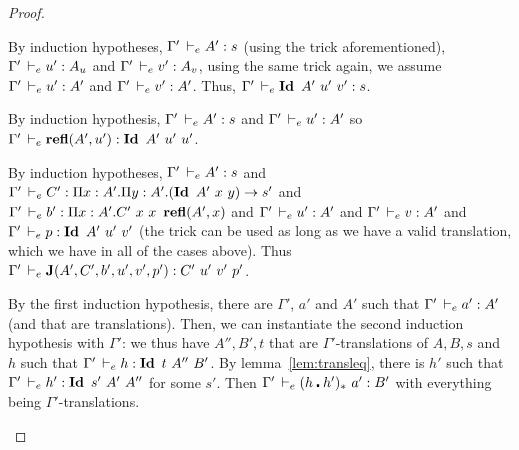 \documentclass[a4paper,english]{lipics-utf8x}
\begin{document}
\begin{proof}
\begin{caselist}
      \begin{graycase}
        \begin{mathc}
        \end{mathc}
        By induction hypotheses, $\Gamma' \,\vdash_e A' : s$ (using the trick
        aforementioned), $\Gamma' \,\vdash_e u' : A_u$ and $\Gamma' \,\vdash_e v' : A_v$,
        using the same trick again, we assume $\Gamma' \,\vdash_e u' : A'$ and
        $\Gamma' \,\vdash_e v' : A'$.
        Thus, $\Gamma' \,\vdash_e \operatorname{\mathbf{Id}~} A'\ u'\ v' : s$.
      \end{graycase}

      \begin{graycase}
        \begin{mathc}
        \end{mathc}
        By induction hypothesis, $\Gamma' \,\vdash_e A' : s$ and
        $\Gamma' \,\vdash_e u' : A'$ so
        $\Gamma' \dere \refl(A',u') : \Id A'\ u'\ u'$.
      \end{graycase}

      \begin{graycase}
        \begin{mathc}
        \end{mathc}
        By induction hypotheses, $\Gamma' \,\vdash_e A' : s$ and
        $\Gamma' \,\vdash_e C' : \Pi x:A'. \Pi y:A'. (\operatorname{\mathbf{Id}~} A'\ x\ y) \to s'$ and
        $\Gamma' \dere b' : \Pi x:A'. C'\ x\ x\ \refl(A',x)$ and
        $\Gamma' \,\vdash_e u' : A'$ and $\Gamma' \,\vdash_e v : A'$ and
        $\Gamma' \,\vdash_e p : \operatorname{\mathbf{Id}~} A'\ u'\ v'$ (the trick can be used as long as we
        have a valid translation, which we have in all of the cases above).
        Thus $\Gamma' \,\vdash_e \operatorname{\mathbf{J}}(A',C',b',u',v',p') : C'\ u'\ v'\ p'$.
      \end{graycase}

      \nextcase
      \begin{mathc}
      \end{mathc}
      By the first induction hypothesis, there are $\Gamma'$, $a'$ and $A'$
      such that $\Gamma' \,\vdash_e a' : A'$ (and that are translations).
      Then, we can instantiate the second induction hypothesis with $\Gamma'$:
      we thus have $A'',B',t$ that are $\Gamma'$-translations of $A,B,s$ and
      $h$ such that $\Gamma' \dere h : \Id t\ A''\ B'$.
      By lemma~\ref{lem:transleq}, there is $h'$ such that
      $\Gamma' \dere h' : \Id s'\ A'\ A''$ for some $s'$.
      Then $\Gamma' \,\vdash_e (h \centerdot h')_*\ a' : B'$ with everything being
      $\Gamma'$-translations.


\end{caselist}
\end{proof}
\end{document}
